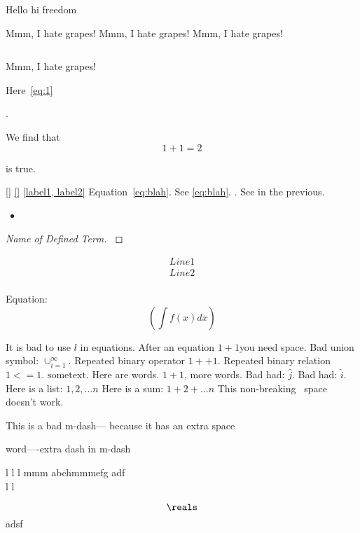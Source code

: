 
Hello hi freedom

Mmm, I hate grapes! 
Mmm, I hate grapes!  
Mmm, I hate grapes! 
 
$$ $$ $$ $$ 
$ $

Mmm, I hate grapes!

Here~\cref{eq:1}

\[
    
\].

We find that
\[
    1 + 1 = 2
\] 

is true.
 
\ref{} 
\cref{}
\cite{}
\label{\alpha}
\label{a,b} 
\cref{label1, label2}
Equation~\ref{eq:blah}.
See \cref{eq:blah}.
\cite[Theorem 1]{a}. 
See in the previous.


\begin{itemize}
    a
    \item  
\end{itemize}

\begin{proof}[Name of Defined Term]
    \label{def:Name of Defined Term}
    

\end{proof}
\begin{align}
    Line 1 \\
    Line 2 \\
\end{align}

Equation:
\[
    (\int f(x) dx)
\] 


It is bad to use $l$ in equations.
After an equation $1+1$you need space.
Bad union symbol: $\cup_{i=1}^\infty$.
Repeated binary operator $1 ++ 1$.
Repeated binary relation $1 <= 1$.
$\mathrm{some text}$.
Here are words. $1 + 1$, more words.
Bad had: $\hat{j}$.
Bad had: $\hat i$.
Here is a list: $1, 2, \dots n$
Here is a sum: $1 + 2 + \dots n$
This non-breaking~ space doesn't work.

This is a bad m-dash---
because it has an extra space

word----extra dash in m-dash
  
 \hat{\jmath} l  l l    mmm abchmmmefg adf
 $$ $$  
 l  l

 
  \[{\reals}\]  
adsf  
    
 
